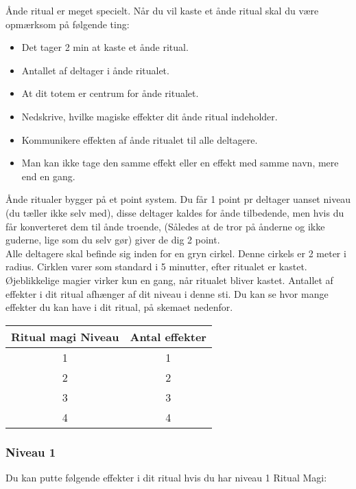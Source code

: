 Ånde ritual er meget specielt. Når du vil kaste et ånde ritual skal du være opmærksom på følgende ting:
\begin{itemize}
    \item Det tager 2 min at kaste et ånde ritual.
    \item Antallet af deltager i ånde ritualet.
    \item  At dit totem er centrum for ånde ritualet.
    \item Nedskrive, hvilke magiske effekter dit ånde ritual indeholder.
    \item Kommunikere effekten af ånde ritualet til alle deltagere. 
    \item Man kan ikke tage den samme effekt eller en effekt med samme navn, mere end en gang.
\end{itemize}

Ånde ritualer bygger på et point system. Du får 1 point pr deltager uanset niveau (du tæller ikke selv med), disse deltager kaldes for ånde tilbedende, men hvis du får konverteret dem til ånde troende, (Således at de tror på ånderne og ikke guderne, lige som du selv gør) giver de dig 2 point. \\
Alle deltagere skal befinde sig inden for en gryn cirkel. Denne cirkels er 2 meter i radius.
Cirklen varer som standard i 5 minutter, efter ritualet er kastet. Øjeblikkelige magier virker kun en gang, når ritualet bliver kastet. Antallet af effekter i dit ritual afhænger af dit niveau i denne sti. Du kan se hvor mange effekter du kan have i dit ritual, på skemaet nedenfor.

\begin{table}[H]
    \centering
    \begin{tabular}{|c|c|}
    \rowcolor{cerulean!80}\hline
        Ritual magi Niveau & Antal effekter \\\hline
        1&1\\\hline
        2&2 \\\hline
        3&3\\\hline
        4&4\\\hline
    \end{tabular}
\end{table}

\subsubsection*{Niveau 1}
Du kan putte følgende effekter i dit ritual hvis du har niveau 1 Ritual Magi:


